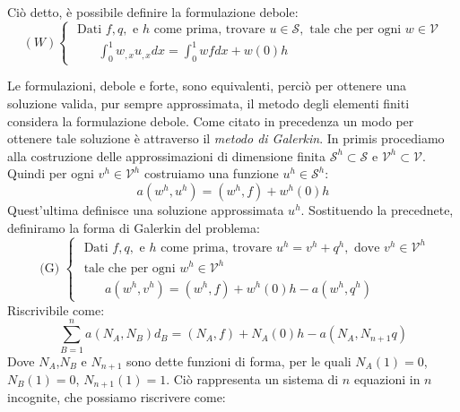     Ciò detto, è possibile definire la formulazione debole:
    \begin{equation}
        (W)\left\{\begin{array}{l}
        \text { Dati } f, q, \text { e } h \text { come prima, trovare } u \in \mathcal{S}, \text { tale che per ogni } w \in \mathcal{V} \\
        \qquad \int_{0}^{1} w_{, x} u_{, x} d x=\int_{0}^{1} w f d x+w(0) h
        \end{array}\right.
    \end{equation}

    Le formulazioni, debole e forte, sono equivalenti, perciò per ottenere una soluzione
    valida, pur sempre approssimata, il metodo degli elementi finiti considera la formulazione
    debole. Come citato in precedenza un modo per ottenere tale soluzione è attraverso
    il \textit{metodo di Galerkin}.
    In primis procediamo alla costruzione delle approssimazioni di dimensione finita
    $\mathcal{S}^{h} \subset \mathcal{S}$ e $\mathcal{V}^{h} \subset \mathcal{V}$.
    Quindi per ogni $v^{h} \in \mathcal{V}^{h}$ costruiamo una funzione
    $u^h \in \mathcal{S}^h$:
    \begin{equation}
        a(w^h,u^h) = (w^h,f) + w^h(0)h
    \end{equation}
    Quest'ultima definisce una soluzione approssimata $u^h$.
    Sostituendo la precednete, definiramo la forma di Galerkin del problema:
    \begin{equation}
        \text { (G) }\left\{\begin{array}{l}
        \text { Dati } f, q, \text { e } h \text { come prima, trovare } u^{h}=v^{h}+q^{h}, \text { dove } v^{h} \in \mathcal{V}^{h} \\
        \text { tale che per ogni } w^{h} \in \mathcal{V}^{h} \\
        \qquad a\left(w^{h}, v^{h}\right)=\left(w^{h}, f\right)+w^{h}(0) h-a\left(w^{h}, q^{h}\right)
        \end{array}\right.
    \end{equation}
    Riscrivibile come:
    \begin{equation}
        \sum_{B=1}^{n} a\left(N_{A}, N_{B}\right) d_{B}=\left(N_{A}, f\right)+N_{A}(0) h-a\left(N_{A}, N_{n+1} q\right)
    \end{equation}
    Dove $N_A$,$N_B$ e $N_{n+1}$ sono dette funzioni di forma, per le quali
    $N_A(1)=0$, $N_B(1)=0$, $N_{n+1}(1)=1$. Ciò rappresenta un sistema di
    $n$ equazioni in $n$ incognite, che possiamo riscrivere come:
